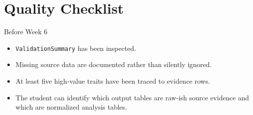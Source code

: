 \section{Quality Checklist}
\begin{checklistbox}{Before Week 6}
\begin{itemize}
  \item \texttt{ValidationSummary} has been inspected.
  \item Missing source data are documented rather than silently ignored.
  \item At least five high-value traits have been traced to evidence rows.
  \item The student can identify which output tables are raw-ish source evidence and which are normalized analysis tables.
\end{itemize}
\end{checklistbox}
